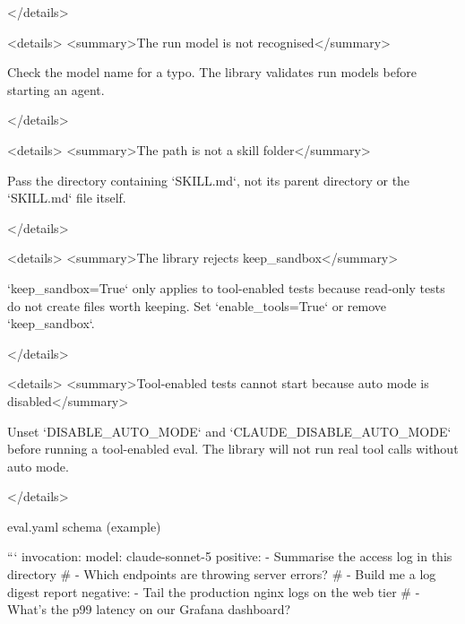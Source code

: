 </details>

<details>
<summary>The run model is not recognised</summary>

Check the model name for a typo.
The library validates run models before starting an agent.

</details>

<details>
<summary>The path is not a skill folder</summary>

Pass the directory containing `SKILL.md`, not its parent directory or the `SKILL.md` file itself.

</details>

<details>
<summary>The library rejects keep_sandbox</summary>

`keep_sandbox=True` only applies to tool-enabled tests because read-only tests do not create files worth keeping.
Set `enable_tools=True` or remove `keep_sandbox`.

</details>

<details>
<summary>Tool-enabled tests cannot start because auto mode is disabled</summary>

Unset `DISABLE_AUTO_MODE` and `CLAUDE_DISABLE_AUTO_MODE` before running a tool-enabled eval.
The library will not run real tool calls without auto mode.

</details>



eval.yaml schema (example)

```
invocation:
  model: claude-sonnet-5
  positive:
  - Summarise the access log in this directory
  # - Which endpoints are throwing server errors?
  # - Build me a log digest report
  negative:
  - Tail the production nginx logs on the web tier
  # - What's the p99 latency on our Grafana dashboard?


